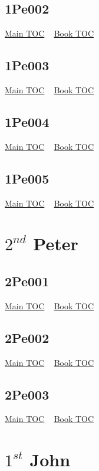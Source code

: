 \documentclass{book}
\begin{document}
  \section{1Pe002}\hyperlink{toc}{Main TOC} ~ \hyperref[subsec:1Pe]{Book TOC} 
  \section{1Pe003}\hyperlink{toc}{Main TOC} ~ \hyperref[subsec:1Pe]{Book TOC} 
  \section{1Pe004}\hyperlink{toc}{Main TOC} ~ \hyperref[subsec:1Pe]{Book TOC} 
  \section{1Pe005}\hyperlink{toc}{Main TOC} ~ \hyperref[subsec:1Pe]{Book TOC} 
  \chapter{$2^{nd}$ Peter} \label{subsec:2Pe} \begin{multicols}{2} \minitoc \end{multicols}
  \section{2Pe001}\hyperlink{toc}{Main TOC} ~ \hyperref[subsec:2Pe]{Book TOC} 
  \section{2Pe002}\hyperlink{toc}{Main TOC} ~ \hyperref[subsec:2Pe]{Book TOC} 
  \section{2Pe003}\hyperlink{toc}{Main TOC} ~ \hyperref[subsec:2Pe]{Book TOC} 
  \chapter{$1^{st}$ John} \label{subsec:1Jn} \begin{multicols}{2} \minitoc \end{multicols}
\end{document}
